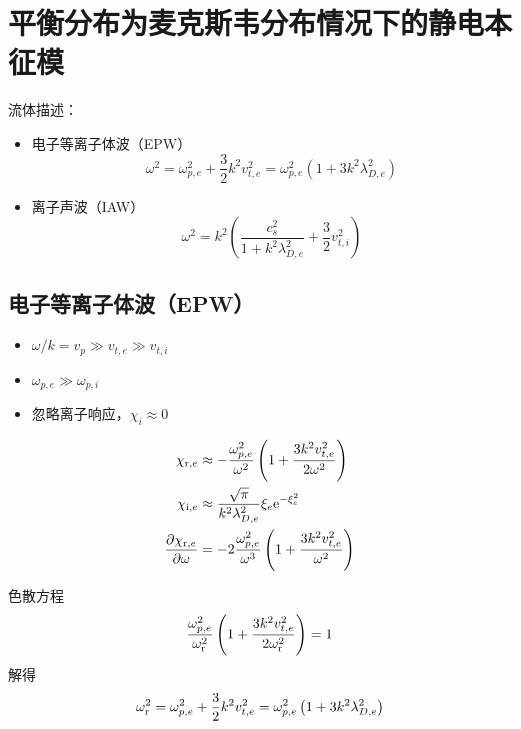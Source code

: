 \section{平衡分布为麦克斯韦分布情况下的静电本征模}

流体描述：
\begin{itemize}
\item 电子等离子体波（EPW）
\begin{equation} \label{eq:321EPW}
    \omega^2 = \omega_{p,e}^2 + \frac{3}{2} k^2 v_{t,e}^2
    = \omega_{p,e}^2 \left( 1 + 3 k^2 \lambda_{D,e}^2 \right)
\end{equation}
\item 离子声波（IAW）
\begin{equation} \label{eq:321IAW}
    \omega^2 = k^2 \left( \frac{c_s^2}{1 + k^2 \lambda_{D,e}^2} + \frac{3}{2} v_{t,i}^2 \right)
\end{equation}
\end{itemize}

\subsection{电子等离子体波（EPW）}

\begin{itemize}
    \item $\omega / k = v_p \gg v_{t,e} \gg v_{t,i}$
    \item $\omega_{p,e} \gg \omega_{p,i}$
    \item 忽略离子响应，$\chi_i \approx 0$
\end{itemize}

\begin{subequations}\begin{align}
\chi_{\mathrm{r},e} &\approx - \frac{\omega_{p,e}^2}{\omega^2} \left( 1 + \frac{3 k^2 v_{t,e}^2}{2 \omega^2} \right) \\
\chi_{\mathrm{i},e} &\approx \frac{\sqrt{\pi}}{k^2 \lambda_{D,e}^2} \xi_e \mathrm{e}^{- \xi_e^2} \\
\pdv{\chi_{\mathrm{r},e}}{\omega} &= - 2 \frac{\omega_{p,e}^2}{\omega^3} \left( 1 + \frac{3 k^2 v_{t,e}^2}{\omega^2} \right)
\end{align}\end{subequations}

色散方程
\begin{equation}
\frac{\omega_{p,e}^2}{\omega_{\mathrm{r}}^2} \left( 1 + \frac{3 k^2 v_{t,e}^2}{2 \omega_{\mathrm{r}}^2} \right) = 1
\end{equation}
解得
\begin{equation}
\omega_{\mathrm{r}}^2 = \omega_{p,e}^2 + \frac{3}{2} k^2 v_{t,e}^2
= \omega_{p,e}^2 \left( 1 + 3 k^2 \lambda_{D,e}^2 \right)
\end{equation}

